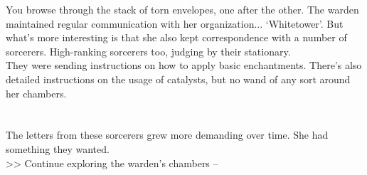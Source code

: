 You browse through the stack of torn envelopes, one after the other. The warden maintained regular communication with her organization... ‘Whitetower’. But what’s more interesting is that she also kept correspondence with a number of sorcerers. High-ranking sorcerers too, judging by their stationary.\\

They were sending instructions on how to apply basic enchantments. There’s also detailed instructions on the usage of catalysts, but no wand of any sort around her chambers.\\
\\
\\

The letters from these sorcerers grew more demanding over time. She had something they wanted.\\

>> Continue exploring the warden’s chambers -- 